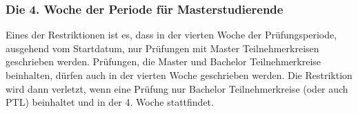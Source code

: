 \subsubsection{Die 4. Woche der Periode für Masterstudierende}
Eines der Restriktionen ist es, dass in der vierten Woche der Prüfungsperiode,
ausgehend vom Startdatum, nur Prüfungen mit Master Teilnehmerkreisen geschrieben werden.
Prüfungen, die Master und Bachelor Teilnehmerkreise beinhalten, dürfen auch in der vierten Woche
geschrieben werden.
Die Restriktion wird dann verletzt, wenn eine Prüfung nur Bachelor Teilnehmerkreise (oder auch PTL) beinhaltet und in der 4. Woche stattfindet.

